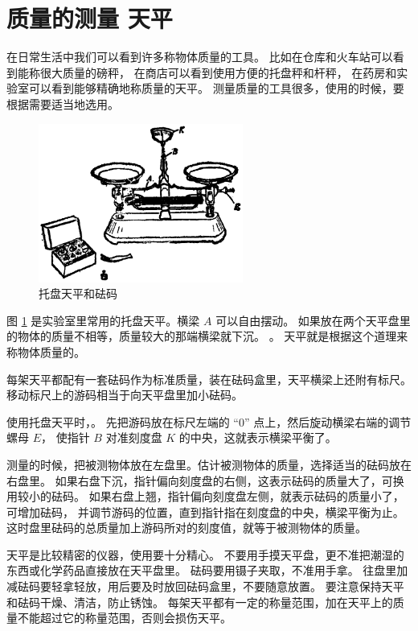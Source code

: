 \section{质量的测量 \quad 天平}\label{sec:1-6}

在日常生活中我们可以看到许多称物体质量的工具。
比如在仓库和火车站可以看到能称很大质量的磅秤，
在商店可以看到使用方便的托盘秤和杆秤，
在药房和实验室可以看到能够精确地称质量的天平。
测量质量的工具很多，使用的时候，要根据需要适当地选用。

\begin{figure}[htbp]
    \centering
    \includegraphics[width=0.6\textwidth]{../pic/czwl1-ch1-14}
    \caption{托盘天平和砝码}\label{fig:1-14}
\end{figure}

图 \ref{fig:1-14} 是实验室里常用的托盘天平。横梁 $A$ 可以自由摆动。
如果放在两个天平盘里的物体的质量不相等，质量较大的那端横梁就下沉。
。
天平就是根据这个道理来称物体质量的。

每架天平都配有一套砝码作为标准质量，装在砝码盒里，天平横梁上还附有标尺。
移动标尺上的游码相当于向天平盘里加小砝码。

使用托盘天平时，。
先把游码放在标尺左端的 “0” 点上，然后旋动横梁右端的调节螺母 $E$，
使指针 $B$ 对准刻度盘 $K$ 的中央，这就表示横梁平衡了。

测量的时候，把被测物体放在左盘里。估计被测物体的质量，选择适当的砝码放在右盘里。
如果右盘下沉，指针偏向刻度盘的右侧，这表示砝码的质量大了，可换用较小的砝码。
如果右盘上翘，指针偏向刻度盘左侧，就表示砝码的质量小了，可增加砝码，
并调节游码的位置，直到指针指在刻度盘的中央，横梁平衡为止。
这时盘里砝码的总质量加上游码所对的刻度值，就等于被测物体的质量。

天平是比较精密的仪器，使用要十分精心。
不要用手摸天平盘，更不准把潮湿的东西或化学药品直接放在天平盘里。
砝码要用镊子夹取，不准用手拿。
往盘里加减砝码要轻拿轻放，用后要及时放回砝码盒里，不要随意放置。
要注意保持天平和砝码干燥、清洁，防止锈蚀。
每架天平都有一定的称量范围，加在天平上的质量不能超过它的称量范围，否则会损伤天平。

